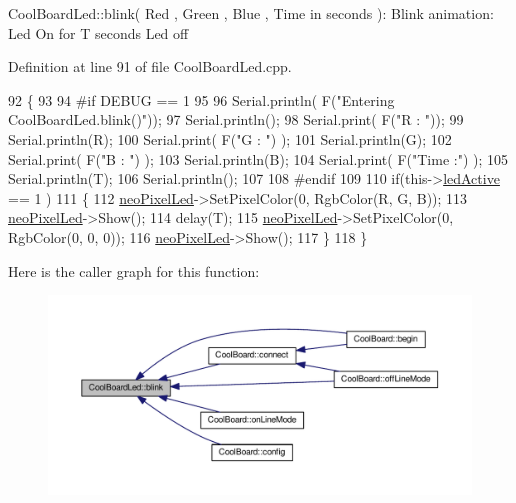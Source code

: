 Cool\+Board\+Led\+::blink( Red , Green , Blue , Time in seconds )\+: Blink animation\+: Led On for T seconds Led off 

Definition at line 91 of file Cool\+Board\+Led.\+cpp.


\begin{DoxyCode}
92 \{
93 
94 \textcolor{preprocessor}{#if DEBUG == 1}
95 
96     Serial.println( F(\textcolor{stringliteral}{"Entering CoolBoardLed.blink()"}));
97     Serial.println();
98     Serial.print( F(\textcolor{stringliteral}{"R : "}));
99     Serial.println(R);
100     Serial.print( F(\textcolor{stringliteral}{"G : "}) );
101     Serial.println(G);
102     Serial.print( F(\textcolor{stringliteral}{"B : "}) );
103     Serial.println(B);
104     Serial.print( F(\textcolor{stringliteral}{"Time :"}) );
105     Serial.println(T);
106     Serial.println();
107 
108 \textcolor{preprocessor}{#endif  }
109 
110     \textcolor{keywordflow}{if}(this->\hyperlink{class_cool_board_led_aadd04d2ecf123247718d77f42fba7f08}{ledActive} == 1 )
111     \{
112         \hyperlink{class_cool_board_led_ac2c13fa462a010cd9242bf297c013923}{neoPixelLed}->SetPixelColor(0, RgbColor(R, G, B));
113         \hyperlink{class_cool_board_led_ac2c13fa462a010cd9242bf297c013923}{neoPixelLed}->Show();
114         delay(T);
115         \hyperlink{class_cool_board_led_ac2c13fa462a010cd9242bf297c013923}{neoPixelLed}->SetPixelColor(0, RgbColor(0, 0, 0));
116         \hyperlink{class_cool_board_led_ac2c13fa462a010cd9242bf297c013923}{neoPixelLed}->Show();
117     \}
118 \}
\end{DoxyCode}
Here is the caller graph for this function\+:\nopagebreak
\begin{figure}[H]
\begin{center}
\leavevmode
\includegraphics[width=350pt]{de/dc0/class_cool_board_led_a96e1ea13003eee34c9dbcef340404426_icgraph}
\end{center}
\end{figure}
\mbox{\label{class_cool_board_led_a1b60e5e30bea96c49ed62ed1bf1ffc8b}} 
